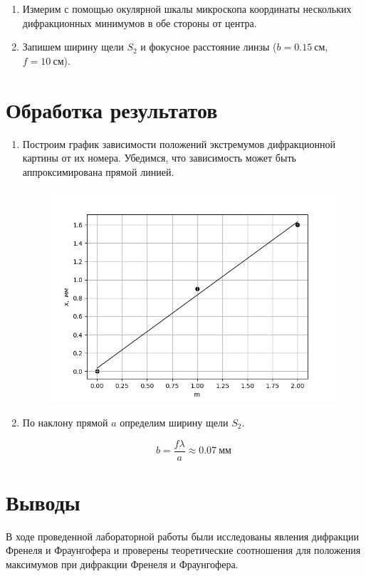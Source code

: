 \documentclass[14pt, a4paper]{report}
\begin{document}
\begin{enumerate}

\item Измерим с помощью окулярной шкалы микроскопа координаты нескольких дифракционных минимумов в обе стороны от центра.

\item Запишем ширину щели $S_2$ и фокусное расстояние линзы ($b=0.15\ см$, $f=10\ см$).

\end{enumerate}

\section{Обработка результатов}

\begin{enumerate}

\item Построим график зависимости положений экстремумов дифракционной картины от их номера. Убедимся, что зависимость может быть аппроксимирована прямой линией.

\begin{figure}[H]
\centering
\includegraphics[scale=0.6]{../images/431m_7}
\end{figure}

\item По наклону прямой $a$ определим ширину щели $S_2$.

\[b=\frac{f\lambda}{a}\approx0.07\ мм\]

\end{enumerate}

\section{Выводы}

В ходе проведенной лабораторной работы были исследованы явления дифракции Френеля и Фраунгофера и проверены теоретические соотношения для положения максимумов при дифракции Френеля и Фраунгофера.
\end{document}
